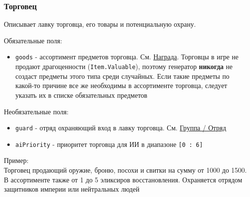 \subsubsection{Торговец}
\label{merchant}
Описывает лавку торговца, его товары и потенциальную охрану.

Обязательные поля:
\begin{itemize}
\item \texttt{goods} - ассортимент предметов торговца. См. \hyperref[loot]{Награда}. Торговцы в игре не продают драгоценности (\texttt{Item.Valuable}), поэтому генератор \textbf{никогда} не создаст предметы этого типа среди случайных. Если такие предметы по какой-то причине все же необходимы в ассортименте торговца, следует указать их в списке обязательных предметов
\end{itemize}

Необязательные поля:
\begin{itemize}
\item \texttt{guard} - отряд охраняющий вход в лавку торговца. См. \hyperref[group]{Группа / Отряд}
\item \texttt{aiPriority} - приоритет торговца для ИИ в диапазоне \texttt{[0 : 6]}
\end{itemize}

Пример:\\
Торговец продающий оружие, броню, посохи и свитки на сумму от 1000 до 1500.
В ассортименте также от 1 до 5 эликсиров восстановления.
Охраняется отрядом защитников империи или нейтральных людей

\begin{figure}[H]

\end{figure}